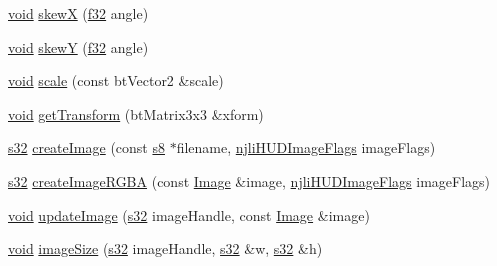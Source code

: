 \begin{DoxyCompactItemize}
\item 
\mbox{\hyperlink{_thread_8h_af1e856da2e658414cb2456cb6f7ebc66}{void}} \mbox{\hyperlink{classnjli_1_1_world_h_u_d_ab0a05d76b5251719b228fed812d69ff7}{skewX}} (\mbox{\hyperlink{_util_8h_a5f6906312a689f27d70e9d086649d3fd}{f32}} angle)
\item 
\mbox{\hyperlink{_thread_8h_af1e856da2e658414cb2456cb6f7ebc66}{void}} \mbox{\hyperlink{classnjli_1_1_world_h_u_d_ac354c68e141696172bd0b1fc07d89f28}{skewY}} (\mbox{\hyperlink{_util_8h_a5f6906312a689f27d70e9d086649d3fd}{f32}} angle)
\item 
\mbox{\hyperlink{_thread_8h_af1e856da2e658414cb2456cb6f7ebc66}{void}} \mbox{\hyperlink{classnjli_1_1_world_h_u_d_a7db32bf294c4d55958d43188457bd866}{scale}} (const bt\+Vector2 \&scale)
\item 
\mbox{\hyperlink{_thread_8h_af1e856da2e658414cb2456cb6f7ebc66}{void}} \mbox{\hyperlink{classnjli_1_1_world_h_u_d_aaadec4b47522d9b7390d3e84ee8a5356}{get\+Transform}} (bt\+Matrix3x3 \&xform)
\item 
\mbox{\hyperlink{_util_8h_aa62c75d314a0d1f37f79c4b73b2292e2}{s32}} \mbox{\hyperlink{classnjli_1_1_world_h_u_d_a06961a0e927da93914ff9f3cb069e778}{create\+Image}} (const \mbox{\hyperlink{_util_8h_a2ff401e087cf786c38a6812723e94473}{s8}} $\ast$filename, \mbox{\hyperlink{namespacenjli_a3c5203f27f547353dd9e29345d747b14}{njli\+H\+U\+D\+Image\+Flags}} image\+Flags)
\item 
\mbox{\hyperlink{_util_8h_aa62c75d314a0d1f37f79c4b73b2292e2}{s32}} \mbox{\hyperlink{classnjli_1_1_world_h_u_d_aab3c3c6a761de7f285b7a99f8a73dc04}{create\+Image\+R\+G\+BA}} (const \mbox{\hyperlink{classnjli_1_1_image}{Image}} \&image, \mbox{\hyperlink{namespacenjli_a3c5203f27f547353dd9e29345d747b14}{njli\+H\+U\+D\+Image\+Flags}} image\+Flags)
\item 
\mbox{\hyperlink{_thread_8h_af1e856da2e658414cb2456cb6f7ebc66}{void}} \mbox{\hyperlink{classnjli_1_1_world_h_u_d_a4e1dcdcdbaf62f4b9fd0412cf5ee23da}{update\+Image}} (\mbox{\hyperlink{_util_8h_aa62c75d314a0d1f37f79c4b73b2292e2}{s32}} image\+Handle, const \mbox{\hyperlink{classnjli_1_1_image}{Image}} \&image)
\item 
\mbox{\hyperlink{_thread_8h_af1e856da2e658414cb2456cb6f7ebc66}{void}} \mbox{\hyperlink{classnjli_1_1_world_h_u_d_a0ee16fbf9fd6ae61ca0a1a220d1eaa90}{image\+Size}} (\mbox{\hyperlink{_util_8h_aa62c75d314a0d1f37f79c4b73b2292e2}{s32}} image\+Handle, \mbox{\hyperlink{_util_8h_aa62c75d314a0d1f37f79c4b73b2292e2}{s32}} \&w, \mbox{\hyperlink{_util_8h_aa62c75d314a0d1f37f79c4b73b2292e2}{s32}} \&h)

\end{DoxyCompactItemize}

